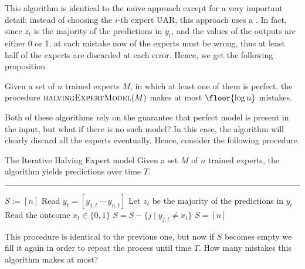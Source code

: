 \documentclass[a4paper, 12pt]{report}
\begin{document}
    This algorithm is identical to the naïve approach except for a very important detail: instead of choosing the $i$-th expert UAR, this approach uses a . In fact, since $z_t$ is the majority of the predictions in $y_t$, and the values of the outputs are either 0 or 1, at each mistake now  of the experts must be wrong, thus at least half of the experts are discarded at each error. Hence, we get the following proposition.

    \begin{framedprop}{}
        Given a set of $n$ trained experts $M$, in which at least one of them is perfect, the procedure $\textsc{halvingExpertModel}(M)$ makes at most $\floor{\log n}$ mistakes.
    \end{framedprop}

    Both of these algorithms rely on the guarantee that  perfect model is present in the input, but what if there is no such model? In this case, the algorithm will clearly discard all the experts eventually. Hence, consider the following procedure.

    \begin{framedalgo}{The Iterative Halving Expert model}
        Given a set $M$ of $n$ trained experts, the algorithm yields predictions over time $T$. \\
        \hrule

        \quad
        \begin{algorithmic}[1]
                \State $S := [n]$
                    \State Read $y_t = [y_{1, t} \ \cdots \ y_{n, t}]$
                    \State Let $z_t$ be the majority of the predictions in $y_t$
                    \State Read the outcome $x_t \in \{0, 1\}$
                        \State $S = S - \{j \mid y_{j, t} \neq x_t\}$
                         
                            \State $S = [n]$
                        \EndIf
                    \EndIf
                \EndFor
            \EndFunction
        \end{algorithmic}
    \end{framedalgo}

    This procedure is identical to the previous one, but now if $S$ becomes empty we fill it again in order to repeat the process until time $T$. How many mistakes this algorithm makes at most?
\end{document}
